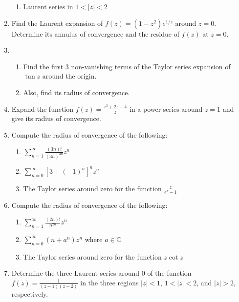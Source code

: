 \documentclass[a4paper,10pt]{article}
\begin{document}
\begin{enumerate}
\begin{enumerate}
 		\item Laurent series in $1 < |z| < 2$
 	\end{enumerate}
 	
 	\item Find the Laurent expansion of $f(z) = (1 - z^2) e^{1/z}$ around $z = 0$. Determine its annulus of convergence and the residue of $f(z)$ at $z = 0$.
 	
 	\item 
 	
 	\begin{enumerate}
 		\item Find the first 3 non-vanishing terms of the Taylor series expansion of $\tan z$ around the origin.
 		
 		\item Also, find its radius of convergence.
 	\end{enumerate}
 	
 	\item Expand the function $f(z) = \frac{z^3 + 2z - 4}{z}$ in a power series around $z = 1$ and give its radius of convergence.
 	
 	\item Compute the radius of convergence of the following:
 	
 	\begin{enumerate}
 		\item $\sum_{n = 1}^{\infty} \frac{(3n)!}{(3n)^{3n}} z^n$
 		
 		\item $\sum_{n = 0}^{\infty} [3 + (-1)^n]^n z^n$
 		
 		\item The Taylor series around zero for the function $\frac{z}{e^z - 1}$
 	\end{enumerate}
 	
 	\item Compute the radius of convergence of the following:
 	
 	\begin{enumerate}
 		\item $\sum_{n = 1}^{\infty} \frac{(2n)!}{n^{2n}} z^n$
 		
 		\item $\sum_{n = 0}^{\infty} (n + a^n) z^n$ where $a \in \mathbb{C}$
 		
 		\item The Taylor series around zero for the function $z \cot z$
 	\end{enumerate}
 	
 	\item Determine the three Laurent series around 0 of the function $f(z) = \frac{1}{(z - 1)(z - 2)}$ in the three regions $|z| < 1$, $1 < |z| < 2$, and $|z| > 2$, respectively.
 	
\end{enumerate}
\end{document}
